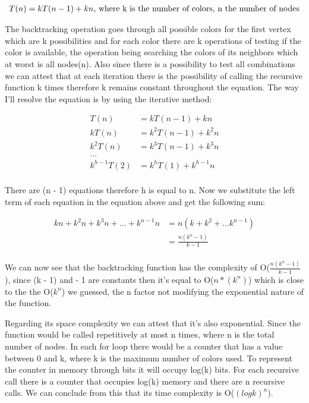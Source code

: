 \documentclass[runningheads]{llncs}
\begin{document}
\begin{align*}
T(n) = kT(n - 1) + kn \textnormal{, where k is the number of colors, n the number of nodes} \\
\end{align*}

The backtracking operation goes through all possible colors for the first vertex which are k possibilities
and for each color there are k operations of testing if the color is available, the operation being
searching the colors of its neighbors which at worst is all nodes(n). Also since there is a possibility
to test all combinations we can attest that at each iteration there is the possibility of calling
the recursive function k times therefore k remains constant throughout the equation. The way I'll
resolve the equation is by using the iterative method:

\begin{align*}
T(n) &= kT(n - 1) + kn \\
kT(n) &= k^2T(n - 1) + k^2n \\
k^2T(n) &= k^3T(n - 1) + k^3n \\
... \\
k^{h - 1}T(2) &= k^hT(1) + k^{h - 1}n \\
\end{align*}

There are (n - 1) equations therefore h is equal to n.
Now we substitute the left term of each equation in the equation above and get the following sum:

\begin{align*}
kn + k^2n + k^3n + ... + k^{n - 1}n &= n(k + k^2 + ... k^{n - 1}) \\
									&= \frac{n(k^n - 1)}{k - 1} \\
\end{align*}

We can now see that the backtracking function has the complexity of O($\frac{n(k^n - 1)}{k - 1}$), since
(k - 1) and - 1 are constants then it's equal to O($n*(k^n)$) which is close to the the O($k^n$) we
guessed, the n factor not modifying the exponential nature of the function.

Regarding its space complexity we can attest that it's also exponential. Since the function would
be called repetitively at most n times, where n is the total number of nodes. In each for loop there would
be a counter that has a value between 0 and k, where k is the maximum number of colors used. To represent the counter in memory through bits
it will occupy log(k) bits. For each recursive call there is a counter that occupies log(k) memory
and there are n recursive calls. We can conclude from this that its time complexity is O($(logk)^n$).
\end{document}

